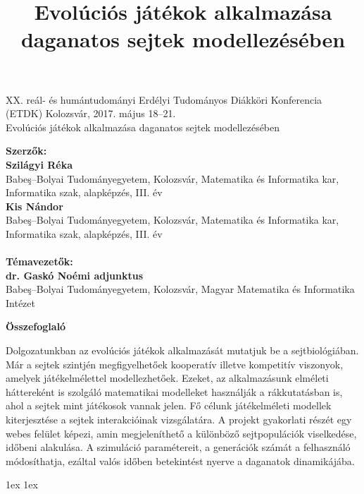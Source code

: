 \documentclass[12pt,a4paper]{ubb_dolgozat}
\title{Evolúciós játékok alkalmazása daganatos sejtek modellezésében}
\begin{document}
\newpage

\thispagestyle{empty}

\begin{center}
	XX. reál- és humántudományi Erdélyi Tudományos Diákköri Konferencia (ETDK) Kolozsvár, 2017. május 18–21.\\
	\vspace{5cm}
	{\huge Evolúciós játékok alkalmazása daganatos sejtek modellezésében}
\end{center}

\vspace{5cm}
\noindent
\textbf{Szerzők:}\\
\textbf{Szilágyi Réka}\\
Babeş–Bolyai Tudományegyetem, Kolozsvár, Matematika és Informatika kar, Informatika szak, alapképzés, III. év\\
\textbf{Kis Nándor}\\
Babeş–Bolyai Tudományegyetem, Kolozsvár, Matematika és Informatika kar, Informatika szak, alapképzés, III. év\\
\\
\textbf{Témavezetők:}\\
\textbf{dr. Gaskó Noémi adjunktus}\\
Babeş–Bolyai Tudományegyetem, Kolozsvár, Magyar Matematika és Informatika Intézet


\newpage

\begin{center}
	\textbf{Összefoglaló}
\end{center}

\vspace{3cm}
	Dolgozatunkban az evolúciós játékok alkalmazását mutatjuk be a sejtbiológiában. Már a sejtek szintjén megfigyelhetőek kooperatív illetve kompetitív viszonyok, amelyek játékelmélettel modellezhetőek. Ezeket, az alkalmazásunk elméleti háttereként is szolgáló matematikai modelleket használják a rákkutatásban is, ahol a sejtek mint játékosok vannak jelen. Fő célunk játékelméleti modellek kiterjesztése a sejtek interakcióinak vizsgálatára. A projekt gyakorlati részét egy webes felület képezi, amin megjeleníthető a különböző sejtpopulációk viselkedése, időbeni alakulása. A szimuláció paramétereit, a generációk számát a felhasználó módosíthatja, ezáltal valós időben betekintést nyerve a daganatok dinamikájába.

{ 
	\newpage
	\baselineskip 1ex
	\parskip 1ex
	\tableofcontents
}











\end{document}
